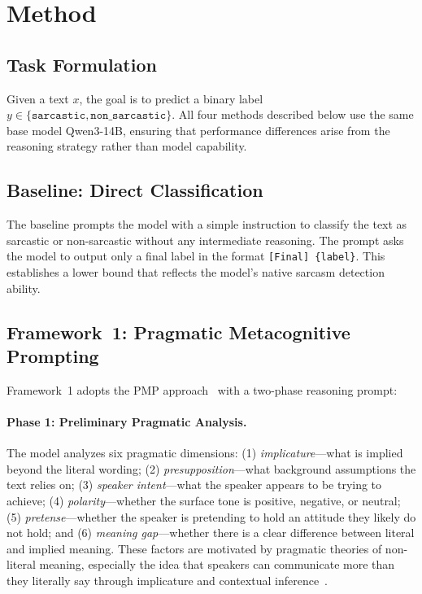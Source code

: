 \documentclass{article} %
\begin{document}
\section{Method}

\subsection{Task Formulation}

Given a text $x$, the goal is to predict a binary label $y \in \{\texttt{sarcastic}, \texttt{non\_sarcastic}\}$. All four methods described below use the same base model Qwen3-14B, ensuring that performance differences arise from the reasoning strategy rather than model capability.

\subsection{Baseline: Direct Classification}

The baseline prompts the model with a simple instruction to classify the text as sarcastic or non-sarcastic without any intermediate reasoning. The prompt asks the model to output only a final label in the format \texttt{[Final] \{label\}}. This establishes a lower bound that reflects the model's native sarcasm detection ability.

\subsection{Framework~1: Pragmatic Metacognitive Prompting}

Framework~1 adopts the PMP approach~\citep{pmp} with a two-phase reasoning prompt:

\paragraph{Phase 1: Preliminary Pragmatic Analysis.}
The model analyzes six pragmatic dimensions: (1) \textit{implicature}---what is implied beyond the literal wording; (2) \textit{presupposition}---what background assumptions the text relies on; (3) \textit{speaker intent}---what the speaker appears to be trying to achieve; (4) \textit{polarity}---whether the surface tone is positive, negative, or neutral; (5) \textit{pretense}---whether the speaker is pretending to hold an attitude they likely do not hold; and (6) \textit{meaning gap}---whether there is a clear difference between literal and implied meaning. These factors are motivated by pragmatic theories of non-literal meaning, especially the idea that speakers can communicate more than they literally say through implicature and contextual inference~\citep{grice1975}.
\end{document}
